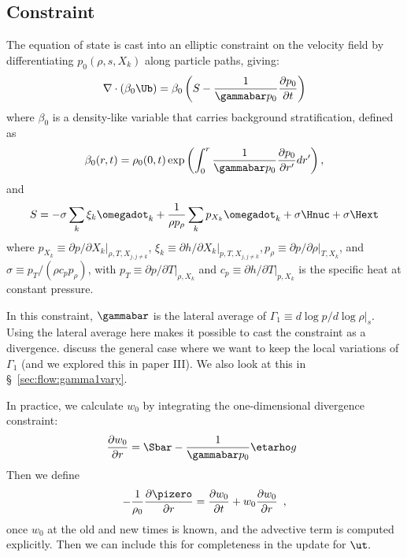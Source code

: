 \subsection{Constraint}

The equation of state is cast into an elliptic constraint on the
velocity field by differentiating $p_0(\rho, s, X_k)$ along particle
paths, giving:
\begin{equation}
\nabla \cdot (\beta_0 \Ub) = 
   \beta_0 \left ( S - \frac{1}{\gammabar p_0} \frac{\partial p_0}{\partial t} \right )
\label{eq:U divergence}
\end{equation}
where $\beta_0$ is a density-like variable that carries background
 stratification, defined as
\begin{equation}
\beta_0(r,t) = \rho_0(0,t)\exp\left(\int_0^r\frac{1}{\gammabar p_0}\frac{\partial p_0}{\partial r'}dr'\right),
\end{equation}
and 
\begin{equation}
S = -\sigma\sum_k\xi_k\omegadot_k + \frac{1}{\rho p_\rho}\sum_k p_{X_k}\omegadot_k + \sigma\Hnuc + \sigma\Hext
\end{equation}
where $p_{X_k} \equiv \left. \partial p / \partial X_k
\right|_{\rho,T,X_{j,j\ne k}}$, $\xi_k \equiv \left. \partial h / 
\partial X_k \right |_{p,T,X_{j,j\ne k}}, 
p_\rho \equiv \left. \partial p/\partial \rho \right |_{T, X_k}$, and
$\sigma \equiv p_T/(\rho c_p p_\rho)$, with
$p_T \equiv \left. \partial p / \partial T \right|_{\rho, X_k}$ and
$c_p \equiv \left.  \partial h / \partial T
\right|_{p,X_k}$ is the specific heat at constant pressure.   

In this constraint, $\gammabar$ is the lateral average of
$\Gamma_1 \equiv d\log p / d\log \rho |_s$.  Using the lateral average
here makes it possible to cast the constraint as a
divergence.  \cite{KP:2012} discuss the general case where we want to
keep the local variations of $\Gamma_1$ (and we explored this in paper
III).  We also look at this in \S~\ref{sec:flow:gamma1vary}.


In practice, we calculate $w_0$ by integrating
the one-dimensional divergence constraint:
\begin{equation}
\frac{\partial w_0}{\partial r} = \Sbar - \frac{1}{\gammabar p_0} \etarho g \enskip 
\end{equation}
Then we define
\begin{equation}
- \frac{1}{\rho_0} \frac{\partial \pizero}{\partial r} = \frac{\partial w_0}{\partial t} + 
   w_0 \frac{\partial w_0}{\partial r} \enskip, \label{eq:pizero}
\end{equation}
once $w_0$ at the old and new times is known, and the advective term is computed explicitly.
Then we can include this for completeness in the update for $\ut.$



